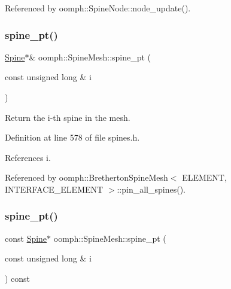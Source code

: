 Referenced by oomph\+::\+Spine\+Node\+::node\+\_\+update().

\mbox{\label{classoomph_1_1SpineMesh_aa8a4afbc37ff7f4c19e44c28c1d7552a}} 
\subsubsection{\texorpdfstring{spine\+\_\+pt()}{spine\_pt()}\hspace{0.1cm}{\footnotesize\ttfamily [1/2]}}
{\footnotesize\ttfamily \hyperlink{classoomph_1_1Spine}{Spine}$\ast$\& oomph\+::\+Spine\+Mesh\+::spine\+\_\+pt (\begin{DoxyParamCaption}\item[{const unsigned long \&}]{i }\end{DoxyParamCaption})\hspace{0.3cm}{\ttfamily [inline]}}



Return the i-\/th spine in the mesh. 



Definition at line 578 of file spines.\+h.



References i.



Referenced by oomph\+::\+Bretherton\+Spine\+Mesh$<$ E\+L\+E\+M\+E\+N\+T, I\+N\+T\+E\+R\+F\+A\+C\+E\+\_\+\+E\+L\+E\+M\+E\+N\+T $>$\+::pin\+\_\+all\+\_\+spines().

\mbox{\label{classoomph_1_1SpineMesh_a13ad12ffbc4d5880aebdfbabc01755e1}} 
\subsubsection{\texorpdfstring{spine\+\_\+pt()}{spine\_pt()}\hspace{0.1cm}{\footnotesize\ttfamily [2/2]}}
{\footnotesize\ttfamily const \hyperlink{classoomph_1_1Spine}{Spine}$\ast$ oomph\+::\+Spine\+Mesh\+::spine\+\_\+pt (\begin{DoxyParamCaption}\item[{const unsigned long \&}]{i }\end{DoxyParamCaption}) const\hspace{0.3cm}{\ttfamily [inline]}}



